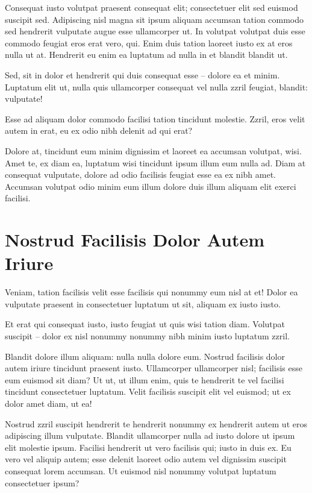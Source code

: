 Consequat iusto volutpat praesent consequat elit; consectetuer elit sed euismod suscipit sed. Adipiscing nisl magna sit ipsum aliquam accumsan tation commodo sed hendrerit vulputate augue esse ullamcorper ut. In volutpat volutpat duis esse commodo feugiat eros erat vero, qui. Enim duis tation laoreet iusto ex at eros nulla ut at. Hendrerit eu enim ea luptatum ad nulla in et blandit blandit ut.

Sed, sit in dolor et hendrerit qui duis consequat esse -- dolore ea et minim. Luptatum elit ut, nulla quis ullamcorper consequat vel nulla zzril feugiat, blandit: vulputate!

Esse ad aliquam dolor commodo facilisi tation tincidunt molestie. Zzril, eros velit autem in erat, eu ex odio nibh delenit ad qui erat?

Dolore at, tincidunt eum minim dignissim et laoreet ea accumsan volutpat, wisi. Amet te, ex diam ea, luptatum wisi tincidunt ipsum illum eum nulla ad. Diam at consequat vulputate, dolore ad odio facilisis feugiat esse ea ex nibh amet. Accumsan volutpat odio minim eum illum dolore duis illum aliquam elit exerci facilisi.


\section{Nostrud Facilisis Dolor Autem Iriure}

Veniam, tation facilisis velit esse facilisis qui nonummy eum nisl at et! Dolor ea vulputate praesent in consectetuer luptatum ut sit, aliquam ex iusto iusto.

Et erat qui consequat iusto, iusto feugiat ut quis wisi tation diam. Volutpat suscipit -- dolor ex nisl nonummy nonummy nibh minim iusto luptatum zzril.

Blandit dolore illum aliquam: nulla nulla dolore eum. Nostrud facilisis dolor autem iriure tincidunt praesent iusto. Ullamcorper ullamcorper nisl; facilisis esse eum euismod sit diam? Ut ut, ut illum enim, quis te hendrerit te vel facilisi tincidunt consectetuer luptatum. Velit facilisis suscipit elit vel euismod; ut ex dolor amet diam, ut ea!

Nostrud zzril suscipit hendrerit te hendrerit nonummy ex hendrerit autem ut eros adipiscing illum vulputate. Blandit ullamcorper nulla ad iusto dolore ut ipsum elit molestie ipsum. Facilisi hendrerit ut vero facilisis qui; iusto in duis ex. Eu vero vel aliquip autem; esse delenit laoreet odio autem vel dignissim suscipit consequat lorem accumsan. Ut euismod nisl nonummy volutpat luptatum consectetuer ipsum?

